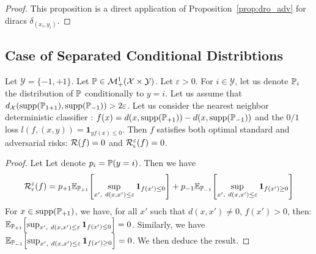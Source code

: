 \begin{proof}
This proposition is a direct application of Proposition~\ref{prop:dro_adv} for diracs $\delta_{(x_i,y_i)}$.
\end{proof}





\subsection{Case of Separated Conditional Distribtions}
\begin{prop} Let $\mathcal{Y} = \{-1,+1\}$. Let $\mathbb{P}\in\mathcal{M}^1_+(\mathcal{X}\times\mathcal{Y})$. Let $\varepsilon>0$. For $i\in\mathcal{Y}$, let us denote $\mathbb{P}_i$ the distribution of $\mathbb{P}$ conditionally to $y=i$. Let us assume that  $d_\mathcal{X}(\operatorname*{supp}(\mathbb{P}_{1+1}),\operatorname*{supp}(\mathbb{P}_{-1}))>2\varepsilon$. Let us consider the nearest neighbor deterministic classifier : $f(x) =  d(x,\operatorname*{supp}(\mathbb{P}_{+1}))-d(x,\operatorname*{supp}(\mathbb{P}_{-1}))$ and the $0/1$ loss $l(f,(x,y))=\mathbf{1}_{yf(x)\leq 0}$. Then $f$ satisfies both optimal standard and adversarial risks: $\mathcal{R}(f)=0$ and $\mathcal{R}_{\epsilon}^\varepsilon(f)=0$.
\end{prop}

\begin{proof} Let 
Let denote $p_i =\mathbb{P}(y=i)$. Then we have
\begin{align*}
 \riskadv^\varepsilon(f)= p_{+1}\mathbb{E}_{\PP_{+1}}\left[\sup_{x',~d(x,x')\leq \varepsilon}\mathbf{1}_{ f(x')\leq 0}\right]+p_{-1}\mathbb{E}_{\PP_{-1}}\left[\sup_{x',~d(x,x')\leq \varepsilon}\mathbf{1}_{ f(x')\geq 0}\right]
\end{align*}
For $x\in \operatorname*{supp}(\mathbb{P}_{+1})$, we have, for all $x'$ such that $d(x,x')\neq 0$, $f(x')>0$, then: $\mathbb{E}_{\PP_{+1}}\left[\sup_{x',~d(x,x')\leq \varepsilon}\mathbf{1}_{ f(x')\leq 0}\right]=0$. Similarly, we have $\mathbb{E}_{\PP_{-1}}\left[\sup_{x',~d(x,x')\leq \varepsilon}\mathbf{1}_{ f(x')\geq 0}\right]=0$. We then deduce the result.
\end{proof}
